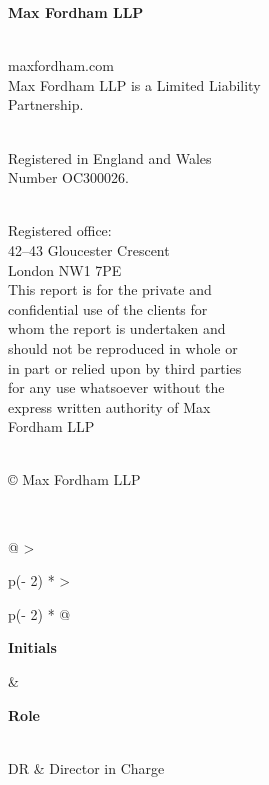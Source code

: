 \documentclass[
  letterpaper,
  DIV=11,
  numbers=noendperiod]{scrreprt}
\begin{document}
\begin{figure}[H]

\begin{minipage}{0.27\linewidth}


\justifying \noindent \scriptsize \textbf{Max Fordham LLP}~\\
\strut ~\\
maxfordham.com~\\
Max Fordham LLP is a Limited Liability~\\
Partnership.~\\
\strut ~\\
Registered in England and Wales~\\
Number OC300026.~\\
\strut ~\\
Registered office:~\\
42--43 Gloucester Crescent~\\
London NW1 7PE~\\
This report is for the private and~\\
confidential use of the clients for~\\
whom the report is undertaken and~\\
should not be reproduced in whole or\\
in part or relied upon by third parties\\
for any use whatsoever without the~\\
express written authority of Max~\\
Fordham LLP~\\
\strut ~\\
© Max Fordham LLP~\end{minipage}%
%
\begin{minipage}{0.03\linewidth}
~\end{minipage}%
%
\begin{minipage}{0.71\linewidth}

\begin{longtable}[]{@{}
  >{\raggedright\arraybackslash}p{(\columnwidth - 2\tabcolsep) * }
  >{\raggedright\arraybackslash}p{(\columnwidth - 2\tabcolsep) * }@{}}
\toprule\noalign{}
\begin{minipage}[b]{\linewidth}\raggedright
\textbf{Initials}
\end{minipage} & \begin{minipage}[b]{\linewidth}\raggedright
\textbf{Role}
\end{minipage} \\
\midrule\noalign{}
\endhead
\bottomrule\noalign{}
\endlastfoot
DR & Director in Charge \\
\end{longtable}

\end{minipage}%

\end{figure}%
\end{document}
